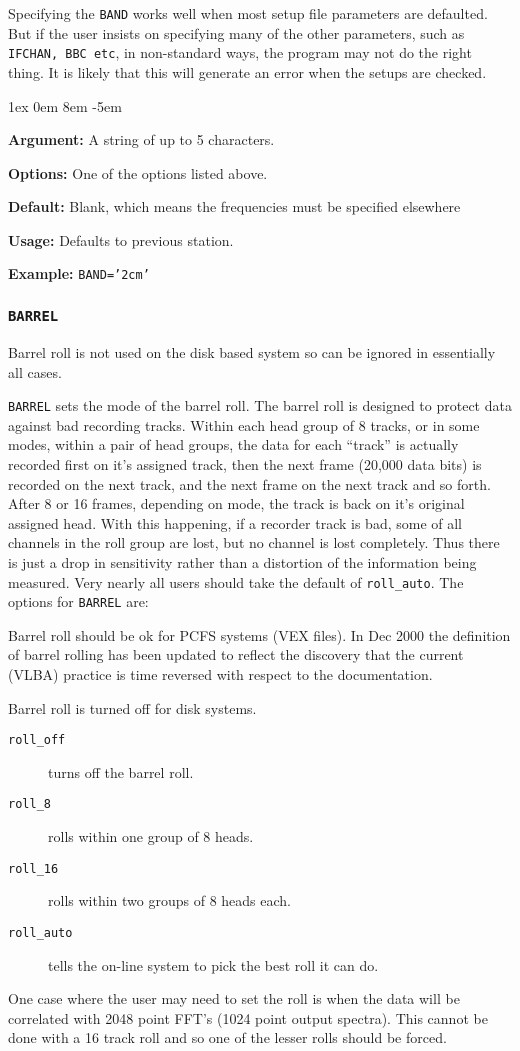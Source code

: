 \documentclass{report}
\newcommand{\rcwbox}[5]{
  \begin{list}{}{\parsep 1ex  \itemsep 0em
                 \leftmargin 8em  \itemindent -5em }
    \item {\bf Argument:} #1
    \item {\bf Options:}  #2
    \item {\bf Default:}  #3
    \item {\bf Usage:}    #4
    \item {\bf Example:}  #5
  \end{list}
}
\begin{document}
Specifying the {\tt BAND} works well when most setup file parameters
are defaulted.  But if the user insists on specifying many of the
other parameters, such as {\tt IFCHAN, BBC etc}, in non-standard
ways, the program may not do the right thing.  It is likely that
this will generate an error when the setups are checked.

\rcwbox
{A string of up to 5 characters.}
{One of the options listed above.}
{Blank, which means the frequencies must be specified elsewhere}
{Defaults to previous station.}
{{\tt BAND='2cm'}}

\subsubsection{\label{SP:BARREL}{\tt BARREL}}

Barrel roll is not used on the disk based system so can be
ignored in essentially all cases.

{\tt BARREL} sets the mode of the barrel roll.  The barrel roll is
designed to protect data against bad recording tracks.  Within each
head group of 8 tracks, or in some modes, within a pair of head
groups, the data for each ``track'' is actually recorded first
on it's assigned track, then the next frame (20,000 data bits)
is recorded on the next track, and the next frame on the next track
and so forth.  After 8 or 16 frames, depending on mode, the track
is back on it's original assigned head.  With this happening, if
a recorder track is bad, some of all channels in the roll group
are lost, but no channel is lost completely.  Thus there is just
a drop in sensitivity rather than a distortion of the information
being measured.  Very nearly all users should take the default
of {\tt roll\_auto}.  The options for {\tt BARREL} are:

Barrel roll should be ok for PCFS systems (VEX files).  In Dec
2000 the definition of barrel rolling has been updated to reflect the
discovery that the current (VLBA) practice is time reversed with
respect to the documentation.

Barrel roll is turned off for disk systems.

\begin{description}
\item[{\tt roll\_off}] turns off the barrel roll.
\item[{\tt roll\_8}] rolls within one group of 8 heads.
\item[{\tt roll\_16}] rolls within two groups of 8 heads each.
\item[{\tt roll\_auto}] tells the on-line system to pick the best
                      roll it can do.
\end{description}
One case where the user may need to set the roll is when the data
will be correlated with 2048 point FFT's (1024 point output spectra).
This cannot be done with a 16 track roll and so one of the lesser
rolls should be forced.
\end{document}
